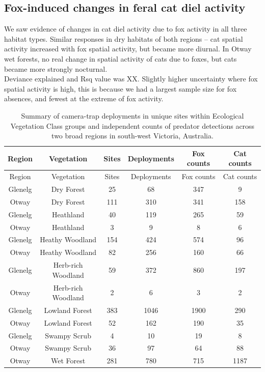 \documentclass[]{elsarticle} %
\begin{document}
\hypertarget{fox-induced-changes-in-feral-cat-diel-activity}{%
\subsection{Fox-induced changes in feral cat diel activity}\label{fox-induced-changes-in-feral-cat-diel-activity}}

We saw evidence of changes in cat diel activity due to fox activity in all three habitat types. Similar responses in dry habitats of both regions -- cat spatial activity increased with fox spatial activity, but became more diurnal.
In Otway wet forests, no real change in spatial activity of cats due to foxes, but cats became more strongly nocturnal.\\
Deviance explained and Rsq value was XX.
Slightly higher uncertainty where fox spatial activity is high, this is because we had a largest sample size for fox absences, and fewest at the extreme of fox activity.

\newpage

\begin{longtable}[]{@{}cccccc@{}}
\caption{Summary of camera-trap deployments in unique sites within Ecological Vegetation Class groups and independent counts of predator detections across two broad regions in south-west Victoria, Australia.}\tabularnewline
\toprule
Region & Vegetation & Sites & Deployments & Fox counts & Cat counts\tabularnewline
\midrule
\endfirsthead
\toprule
Region & Vegetation & Sites & Deployments & Fox counts & Cat counts\tabularnewline
\midrule
\endhead
Glenelg & Dry Forest & 25 & 68 & 347 & 9\tabularnewline
Otway & Dry Forest & 111 & 310 & 341 & 158\tabularnewline
Glenelg & Heathland & 40 & 119 & 265 & 59\tabularnewline
Otway & Heathland & 3 & 9 & 8 & 6\tabularnewline
Glenelg & Heathy Woodland & 154 & 424 & 574 & 96\tabularnewline
Otway & Heathy Woodland & 82 & 256 & 160 & 66\tabularnewline
Glenelg & Herb-rich Woodland & 59 & 372 & 860 & 197\tabularnewline
Otway & Herb-rich Woodland & 2 & 6 & 3 & 2\tabularnewline
Glenelg & Lowland Forest & 383 & 1046 & 1900 & 290\tabularnewline
Otway & Lowland Forest & 52 & 162 & 190 & 35\tabularnewline
Glenelg & Swampy Scrub & 4 & 10 & 19 & 8\tabularnewline
Otway & Swampy Scrub & 36 & 97 & 64 & 88\tabularnewline
Otway & Wet Forest & 281 & 780 & 715 & 1187\tabularnewline
\bottomrule
\end{longtable}

\newpage
\end{document}
